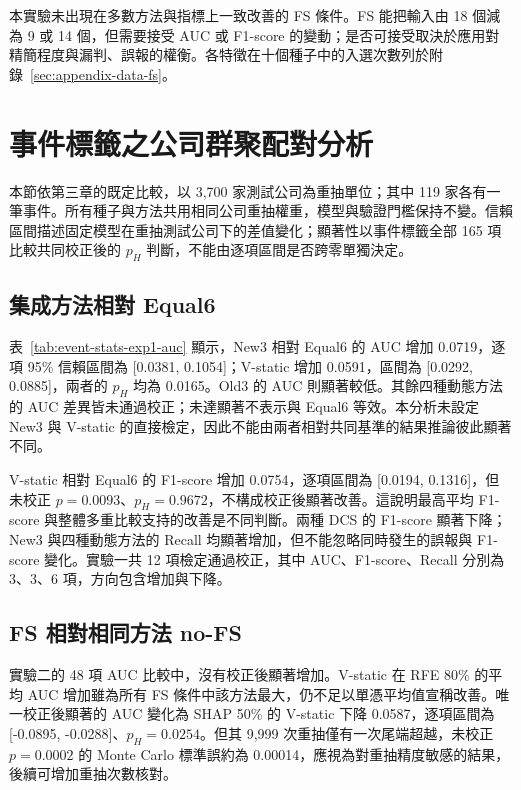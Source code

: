 本實驗未出現在多數方法與指標上一致改善的 FS 條件。FS 能把輸入由 18 個減為 9 或 14 個，但需要接受 AUC 或 F1-score 的變動；是否可接受取決於應用對精簡程度與漏判、誤報的權衡。各特徵在十個種子中的入選次數列於附錄~\ref{sec:appendix-data-fs}。

\section{事件標籤之公司群聚配對分析}\label{sec:results-event-statistics}

本節依第三章的既定比較，以 3,700 家測試公司為重抽單位；其中 119 家各有一筆事件。所有種子與方法共用相同公司重抽權重，模型與驗證門檻保持不變。信賴區間描述固定模型在重抽測試公司下的差值變化；顯著性以事件標籤全部 165 項比較共同校正後的 \(p_H\) 判斷，不能由逐項區間是否跨零單獨決定。

\subsection{集成方法相對 Equal6}



表~\ref{tab:event-stats-exp1-auc} 顯示，New3 相對 Equal6 的 AUC 增加 0.0719，逐項 95\% 信賴區間為 [0.0381, 0.1054]；V-static 增加 0.0591，區間為 [0.0292, 0.0885]，兩者的 \(p_H\) 均為 0.0165。Old3 的 AUC 則顯著較低。其餘四種動態方法的 AUC 差異皆未通過校正；未達顯著不表示與 Equal6 等效。本分析未設定 New3 與 V-static 的直接檢定，因此不能由兩者相對共同基準的結果推論彼此顯著不同。

V-static 相對 Equal6 的 F1-score 增加 0.0754，逐項區間為 [0.0194, 0.1316]，但未校正 \(p=0.0093\)、\(p_H=0.9672\)，不構成校正後顯著改善。這說明最高平均 F1-score 與整體多重比較支持的改善是不同判斷。兩種 DCS 的 F1-score 顯著下降；New3 與四種動態方法的 Recall 均顯著增加，但不能忽略同時發生的誤報與 F1-score 變化。實驗一共 12 項檢定通過校正，其中 AUC、F1-score、Recall 分別為 3、3、6 項，方向包含增加與下降。

\subsection{FS 相對相同方法 no-FS}

實驗二的 48 項 AUC 比較中，沒有校正後顯著增加。V-static 在 RFE 80\% 的平均 AUC 增加雖為所有 FS 條件中該方法最大，仍不足以單憑平均值宣稱改善。唯一校正後顯著的 AUC 變化為 SHAP 50\% 的 V-static 下降 0.0587，逐項區間為 [-0.0895, -0.0288]、\(p_H=0.0254\)。但其 9,999 次重抽僅有一次尾端超越，未校正 \(p=0.0002\) 的 Monte Carlo 標準誤約為 0.00014，應視為對重抽精度敏感的結果，後續可增加重抽次數核對。

